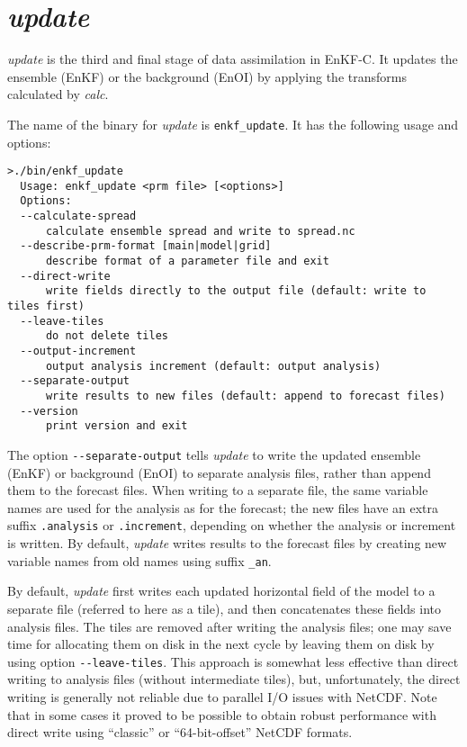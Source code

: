 \documentclass[11pt]{report}
\begin{document}
\section{\emph{update}}

\emph{update} is the third and final stage of data assimilation in EnKF-C.
It updates the ensemble (EnKF) or the background (EnOI) by applying the transforms calculated by \emph{calc}.

The name of the binary for \emph{update} is \verb|enkf_update|.
It has the following usage and options:
\begin{Verbatim}[frame=single,fontsize=\footnotesize]
>./bin/enkf_update
  Usage: enkf_update <prm file> [<options>]
  Options:
  --calculate-spread
      calculate ensemble spread and write to spread.nc
  --describe-prm-format [main|model|grid]
      describe format of a parameter file and exit
  --direct-write
      write fields directly to the output file (default: write to tiles first)
  --leave-tiles
      do not delete tiles
  --output-increment
      output analysis increment (default: output analysis)
  --separate-output
      write results to new files (default: append to forecast files)
  --version
      print version and exit
\end{Verbatim}

The option \verb|--separate-output| tells \emph{update} to write the updated ensemble (EnKF) or background (EnOI) to separate analysis files, rather than append them to the forecast files.
When writing to a separate file, the same variable names are used for the analysis as for the forecast; the new files have an extra suffix \verb|.analysis| or \verb|.increment|, depending on whether the analysis or increment is written.
By default, \emph{update} writes results to the forecast files by creating new variable names from old names using suffix \verb|_an|.

By default, \emph{update} first writes each updated horizontal field of the model to a separate file (referred to here as a tile), and then concatenates these fields into analysis files.
The tiles are removed after writing the analysis files; one may save time for allocating them on disk in the next cycle by leaving them on disk by using option \verb|--leave-tiles|.
This approach is somewhat less effective than direct writing to analysis files (without intermediate tiles), but, unfortunately, the direct writing is generally not reliable due to parallel I/O issues with NetCDF.
Note that in some cases it proved to be possible to obtain robust performance with direct write using ``classic'' or ``64-bit-offset'' NetCDF formats.
\end{document}
